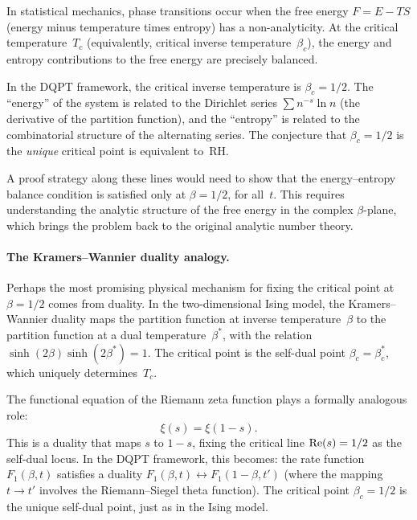 In statistical mechanics, phase transitions occur when the free energy $F = E - TS$
(energy minus temperature times entropy) has a non-analyticity. At the critical
temperature~$T_c$ (equivalently, critical inverse temperature~$\beta_c$), the energy and
entropy contributions to the free energy are precisely balanced.

In the DQPT framework, the critical inverse temperature is $\beta_c = 1/2$. The
``energy'' of the system is related to the Dirichlet series
$\sum n^{-s}\ln n$ (the derivative of the partition function), and the ``entropy'' is
related to the combinatorial structure of the alternating series. The conjecture that
$\beta_c = 1/2$ is the \emph{unique} critical point is equivalent to~RH.

A proof strategy along these lines would need to show that the energy--entropy balance
condition is satisfied only at $\beta = 1/2$, for all~$t$. This requires understanding
the analytic structure of the free energy in the complex $\beta$-plane, which brings the
problem back to the original analytic number theory.

\paragraph{The Kramers--Wannier duality analogy.}
Perhaps the most promising physical mechanism for fixing the critical point at
$\beta = 1/2$ comes from duality. In the two-dimensional Ising model, the
Kramers--Wannier duality maps the partition function at inverse temperature~$\beta$ to
the partition function at a dual temperature~$\beta^*$, with the relation
$\sinh(2\beta)\sinh(2\beta^*) = 1$. The critical point is the self-dual point
$\beta_c = \beta_c^*$, which uniquely determines~$T_c$.

The functional equation of the Riemann zeta function plays a formally analogous role:
\begin{equation}\label{eq:xi-duality}
  \xi(s) = \xi(1 - s).
\end{equation}
This is a duality that maps $s$ to $1 - s$, fixing the critical line $\operatorname{Re}(s) = 1/2$ as
the self-dual locus. In the DQPT framework, this becomes: the rate function
$F_1(\beta, t)$ satisfies a duality $F_1(\beta, t) \longleftrightarrow F_1(1 - \beta, t')$
(where the mapping $t \to t'$ involves the Riemann--Siegel theta function). The critical
point $\beta_c = 1/2$ is the unique self-dual point, just as in the Ising model.

